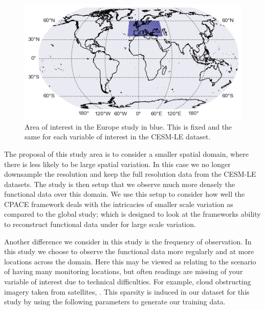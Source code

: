 \begin{figure}
	\centering
	\includegraphics[width=\textwidth]{cesm_eur_bbox}
	\caption{Area of interest in the Europe study in blue. This is fixed and the same for each variable of interest in the CESM-LE dataset.}
	\label{fig:cesm_eur_bbox}
\end{figure}

The proposal of this study area is to consider a smaller spatial domain, where there is less likely to be large spatial variation. 
In this case we no longer downsample the resolution and keep the full resolution data from the CESM-LE datasets.
The study is then setup that we observe much more densely the functional data over this domain.
We use this setup to consider how well the CPACE framework deals with the intricacies of smaller scale variation as compared to the global study; which is designed to look at the frameworks ability to reconstruct functional data under for large scale variation.

Another difference we consider in this study is the frequency of observation.
In this study we choose to observe the functional data more regularly and at more locations across the domain.
Here this may be viewed as relating to the scenario of having many monitoring locations, but often readings are missing of your variable of interest due to technical difficulties.
For example, cloud obstructing imagery taken from satellites, \citep{meraner_cloud_2020}.
This sparsity is induced in our dataset for this study by using the following parameters to generate our training data.

